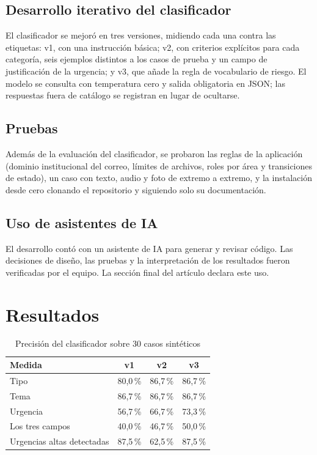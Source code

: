 \documentclass[conference]{IEEEtran}
\begin{document}
\subsection{Desarrollo iterativo del clasificador}
El clasificador se mejoró en tres versiones, midiendo cada una contra las etiquetas: v1, con una instrucción básica; v2, con criterios explícitos para cada categoría, seis ejemplos distintos a los casos de prueba y un campo de justificación de la urgencia; y v3, que añade la regla de vocabulario de riesgo. El modelo se consulta con temperatura cero y salida obligatoria en JSON; las respuestas fuera de catálogo se registran en lugar de ocultarse.

\subsection{Pruebas}
Además de la evaluación del clasificador, se probaron las reglas de la aplicación (dominio institucional del correo, límites de archivos, roles por área y transiciones de estado), un caso con texto, audio y foto de extremo a extremo, y la instalación desde cero clonando el repositorio y siguiendo solo su documentación.

\subsection{Uso de asistentes de IA}
El desarrollo contó con un asistente de IA para generar y revisar código. Las decisiones de diseño, las pruebas y la interpretación de los resultados fueron verificadas por el equipo. La sección final del artículo declara este uso.

\section{Resultados}
\begin{table}[!t]
\caption{Precisión del clasificador sobre 30 casos sintéticos}
\label{tab:resultados}
\centering
\begin{tabular}{lccc}
\hline
\textbf{Medida} & \textbf{v1} & \textbf{v2} & \textbf{v3} \\
\hline
Tipo & 80,0\,\% & 86,7\,\% & 86,7\,\% \\
Tema & 86,7\,\% & 86,7\,\% & 86,7\,\% \\
Urgencia & 56,7\,\% & 66,7\,\% & 73,3\,\% \\
Los tres campos & 40,0\,\% & 46,7\,\% & 50,0\,\% \\
Urgencias altas detectadas & 87,5\,\% & 62,5\,\% & 87,5\,\% \\
\hline
\end{tabular}
\end{table}
\end{document}
